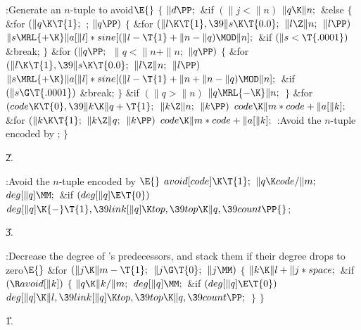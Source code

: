 \Y\B\4:Generate an $n$-tuple to avoid\X${}\E{}$\6
${}\{{}$\1\6
${}\|d\PP;{}$\6
\&{if} ${}(\|j<\|n){}$\1\5
${}\|q\K\|n;{}$\2\6
\&{else}\5
${}\{{}$\1\6
\&{for} ${}(\|q\K\T{1};{}$  ; ${}\|q\PP){}$\5
${}\{{}$\1\6
\&{for} ${}(\|l\K\T{1},\39\|s\K\T{0.0};{}$ ${}\|l\Z\|n;{}$ ${}\|l\PP){}$\1\5
${}\|s\MRL{+{\K}}\|a[\|l]*\\{sine}[(\|l-\T{1}+\|n-\|q)\MOD\|n];{}$\2\6
\&{if} ${}(\|s<\T{.0001}){}$\1\5
\&{break};\2\6
\4${}\}{}$\2\6
\&{for} ${}(\|q\PP;{}$ ${}\|q<\|n+\|n;{}$ ${}\|q\PP){}$\5
${}\{{}$\1\6
\&{for} ${}(\|l\K\T{1},\39\|s\K\T{0.0};{}$ ${}\|l\Z\|n;{}$ ${}\|l\PP){}$\1\5
${}\|s\MRL{+{\K}}\|a[\|l]*\\{sine}[(\|l-\T{1}+\|n+\|n-\|q)\MOD\|n];{}$\2\6
\&{if} ${}(\|s\G\T{.0001}){}$\1\5
\&{break};\2\6
\4${}\}{}$\2\6
\&{if} ${}(\|q>\|n){}$\1\5
${}\|q\MRL{-{\K}}\|n;{}$\2\6
\4${}\}{}$\2\6
\&{for} ${}(\\{code}\K\T{0},\39\|k\K\|q+\T{1};{}$ ${}\|k\Z\|n;{}$ ${}\|k\PP){}$%
\1\5
${}\\{code}\K\|m*\\{code}+\|a[\|k];{}$\2\6
\&{for} ${}(\|k\K\T{1};{}$ ${}\|k\Z\|q;{}$ ${}\|k\PP){}$\1\5
${}\\{code}\K\|m*\\{code}+\|a[\|k];{}$\2\6
:Avoid the $n$-tuple encoded by \X;\6
\4${}\}{}$\2\par
\U2.\fi

\B{}:Avoid the $n$-tuple encoded by \X${}\E{}$\6
$\\{avoid}[\\{code}]\K\T{1};{}$\6
${}\|q\K\\{code}/\|m;{}$\6
${}\\{deg}[\|q]\MM;{}$\6
\&{if} ${}(\\{deg}[\|q]\E\T{0}){}$\1\5
${}\\{deg}[\|q]\K{-}\T{1},\39\\{link}[\|q]\K\\{top},\39\\{top}\K\|q,\39%
\\{count}\PP{}$;\2\par
\U3.\fi

\B{}:Decrease the degree of 's predecessors, and stack them if
their degree drops to zero\X${}\E{}$\6
\&{for} ${}(\|j\K\|m-\T{1};{}$ ${}\|j\G\T{0};{}$ ${}\|j\MM){}$\5
${}\{{}$\1\6
${}\|k\K\|l+\|j*\\{space};{}$\6
\&{if} ${}(\R\\{avoid}[\|k]){}$\5
${}\{{}$\1\6
${}\|q\K\|k/\|m;{}$\6
${}\\{deg}[\|q]\MM;{}$\6
\&{if} ${}(\\{deg}[\|q]\E\T{0}){}$\1\5
${}\\{deg}[\|q]\K\|l,\39\\{link}[\|q]\K\\{top},\39\\{top}\K\|q,\39\\{count}%
\PP;{}$\2\6
\4${}\}{}$\2\6
\4${}\}{}$\2\par
\U1.\fi

